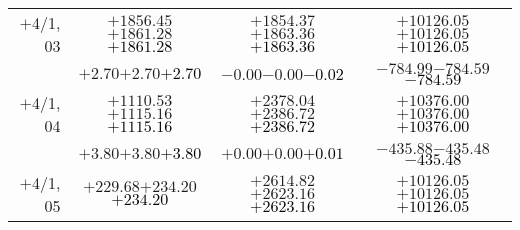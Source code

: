 \documentclass[compress]{beamer}
\begin{document}
\begin{frame}
{\begin{tabular}{r | c | c | c}
$+$4/1, 03 & $+1856.45$\hspace{0.1 cm}$+1861.28$\hspace{0.1 cm}\textcolor{black}{$+1861.28$} & $+1854.37$\hspace{0.1 cm}$+1863.36$\hspace{0.1 cm}\textcolor{black}{$+1863.36$} & $+10126.05$\hspace{0.1 cm}$+10126.05$\hspace{0.1 cm}\textcolor{black}{$+10126.05$} \\
           & $+2.70$\hspace{0.1 cm}$+2.70$\hspace{0.1 cm}\textcolor{black}{$+2.70$} & $-0.00$\hspace{0.1 cm}$-0.00$\hspace{0.1 cm}\textcolor{black}{$-0.02$} & $-784.99$\hspace{0.1 cm}$-784.59$\hspace{0.1 cm}\textcolor{black}{$-784.59$} \\
$+$4/1, 04 & $+1110.53$\hspace{0.1 cm}$+1115.16$\hspace{0.1 cm}\textcolor{black}{$+1115.16$} & $+2378.04$\hspace{0.1 cm}$+2386.72$\hspace{0.1 cm}\textcolor{black}{$+2386.72$} & $+10376.00$\hspace{0.1 cm}$+10376.00$\hspace{0.1 cm}\textcolor{black}{$+10376.00$} \\
           & $+3.80$\hspace{0.1 cm}$+3.80$\hspace{0.1 cm}\textcolor{black}{$+3.80$} & $+0.00$\hspace{0.1 cm}$+0.00$\hspace{0.1 cm}\textcolor{black}{$+0.01$} & $-435.88$\hspace{0.1 cm}$-435.48$\hspace{0.1 cm}\textcolor{black}{$-435.48$} \\
$+$4/1, 05 & $+229.68$\hspace{0.1 cm}$+234.20$\hspace{0.1 cm}\textcolor{black}{$+234.20$} & $+2614.82$\hspace{0.1 cm}$+2623.16$\hspace{0.1 cm}\textcolor{black}{$+2623.16$} & $+10126.05$\hspace{0.1 cm}$+10126.05$\hspace{0.1 cm}\textcolor{black}{$+10126.05$} \\

\end{tabular}}
\end{frame}
\end{document}
